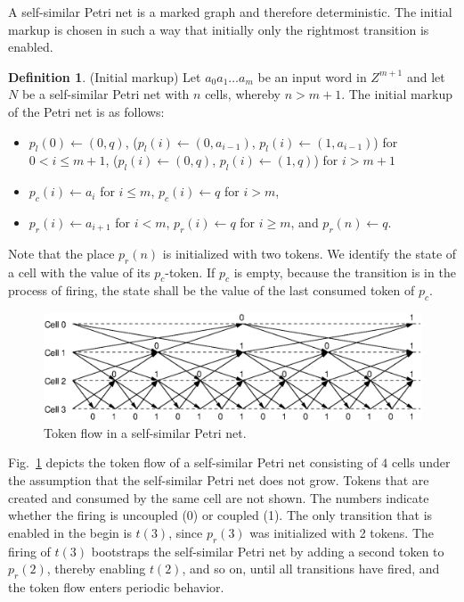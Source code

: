 \documentclass[pre,showpacs,showkeys,preprint]{revtex4}
\theoremstyle{definition}
\newtheorem{defn}{Definition}
\begin{document}
A self-similar Petri net is a marked graph and therefore deterministic.
The initial markup is chosen in such a way that initially only the rightmost transition is enabled.

\begin{defn}(Initial markup)
Let $a_0 a_1 \ldots a_m$ be an input word in $Z^{m+1}$ and let
$N$ be a self-similar Petri net with $n$ cells, whereby $n > m + 1$.
The initial markup of the Petri net is as follows:
\begin{itemize}
\item $p_l(0) \leftarrow (0, q)$,
($p_l(i) \leftarrow (0, a_{i-1})$, $p_l(i) \leftarrow (1, a_{i-1})$) for $0 < i \leq m + 1$,
($p_l(i) \leftarrow (0, q)$, $p_l(i) \leftarrow (1, q)$) for  $i > m + 1$
\item $p_c(i) \leftarrow a_i$ for $i \leq m$, $p_c(i) \leftarrow q$ for $i > m$,
\item
$p_r(i) \leftarrow a_{i+1}$ for $i < m$, $p_r(i) \leftarrow q$ for $i \geq m$, and $p_r(n) \leftarrow q$.
\end{itemize}
\end{defn}

Note that the place $p_r(n)$ is initialized with two tokens.
We identify the state of a cell with the value of its $p_c$-token.
If $p_c$ is empty, because
the transition is in the process of firing, the state shall be the value of the last consumed token of $p_c$.

\begin{figure}
\begin{center}
\includegraphics[scale=0.8]{2008-sica-TokenFlow.eps}
\caption{\label{token-flow} Token flow in a self-similar Petri net.}
\end{center}
\end{figure}

Fig.~\ref{token-flow} depicts the token flow of a self-similar Petri net consisting of $4$ cells under the assumption
that the self-similar Petri net does not grow.
Tokens that are created and consumed by the same cell are not shown.
The numbers indicate whether the firing is uncoupled (0) or coupled (1).
The only transition that is enabled in the begin is $t(3)$, since $p_r(3)$ was initialized with 2 tokens.
The firing of $t(3)$ bootstraps the self-similar Petri net by adding a second token to $p_r(2)$, thereby enabling $t(2)$, and so on,
until all transitions have fired,
and the token flow enters periodic behavior.
\end{document}
